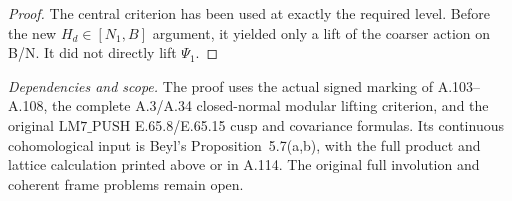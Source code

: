 \begin{proof}
The central criterion has been used at exactly the required level. Before the new \(H_d\in[N_1,B]\) argument, it yielded only a lift of the coarser action on B/N. It did not directly lift \(\Psi_1\).

\end{proof}
\noindent\emph{Dependencies and scope.}
The proof uses the actual signed marking of A.103--A.108,
the complete A.3/A.34 closed-normal modular lifting criterion,
and the original \(\mathrm{LM7\_PUSH}\) E.65.8/E.65.15 cusp and covariance
formulas. Its continuous cohomological input is Beyl's Proposition~5.7(a,b),
with the full product and lattice calculation printed above or in A.114.
The original full involution and coherent frame problems remain open.
